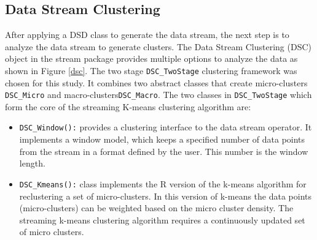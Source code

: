 
\subsection{Data Stream Clustering}
After applying a DSD class to generate the data stream, the next step is to analyze the data stream to generate clusters. The Data Stream Clustering (DSC) object in the stream package provides multiple options to analyze the data as shown in Figure \ref{dsc}. The two stage \texttt{DSC\_TwoStage} clustering framework was chosen for this study. It combines two abstract classes that create micro-clusters \texttt{DSC\_Micro} and macro-clusters\texttt{DSC\_Macro}.
The two classes in \texttt{DSC\_TwoStage} which form the core of the streaming K-means clustering algorithm are: 

    \begin{itemize}
        \item\texttt{DSC\_Window():} provides a clustering interface to the data stream operator. It implements a window model, which keeps a specified number of data points from the stream in a format defined by the user. This number is the window length. 
        
        \item\texttt{DSC\_Kmeans():} class implements the R version of the k-means algorithm for reclustering a set of micro-clusters. In this version of k-means the data points (micro-clusters) can be weighted based on the micro cluster density. The streaming k-means clustering algorithm requires a continuously updated set of micro clusters.

    \end{itemize}



